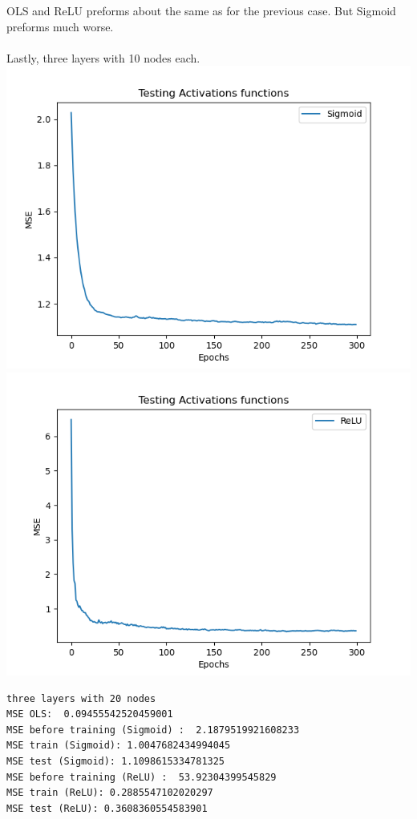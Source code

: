 \documentclass[12pt, letterpaper, twoside]{article}
\begin{document}
OLS and ReLU preforms about the same as for the previous case. But Sigmoid preforms much worse.\\
\ \\
Lastly, three layers with 10 nodes each.\\
\includegraphics[scale=0.5]{"three_hidden_10_sigmoid"}\\
\includegraphics[scale=0.5]{"three_hidden_10_ReLU"}
\begin{verbatim}
three layers with 20 nodes
MSE OLS:  0.09455542520459001
MSE before training (Sigmoid) :  2.1879519921608233
MSE train (Sigmoid): 1.0047682434994045
MSE test (Sigmoid): 1.1098615334781325
MSE before training (ReLU) :  53.92304399545829
MSE train (ReLU): 0.2885547102020297
MSE test (ReLU): 0.3608360554583901
\end{verbatim}
\end{document}
